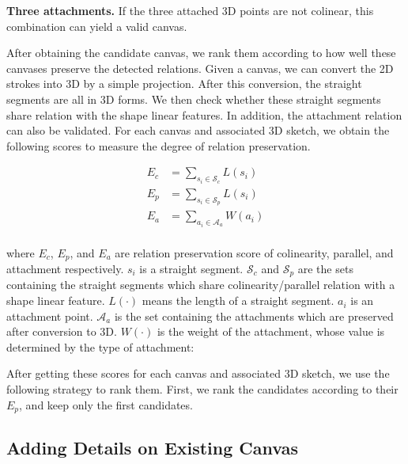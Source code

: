 \textbf{Three attachments.} If the three attached 3D points are not colinear, this combination can yield a valid canvas.

After obtaining the candidate canvas, we rank them according to how well these canvases preserve the detected relations. Given a canvas, we can convert the 2D strokes into 3D by a simple projection. After this conversion, the straight segments are all in 3D forms. We then check whether these straight segments share relation with the shape linear features. In addition, the attachment relation can also be validated. For each canvas and associated 3D sketch, we obtain the following scores to measure the degree of relation preservation.

\begin{equation}
\begin{aligned}
E_c &= \sum_{s_i\in \mathcal{S}_c} L(s_i)\\  
E_p &= \sum_{s_i\in \mathcal{S}_p} L(s_i)\\
E_a &= \sum_{a_i\in \mathcal{A}_a} W(a_i)\\
\end{aligned}
\end{equation}

where $E_c$, $E_p$, and $E_a$ are relation preservation score of colinearity, parallel, and attachment respectively. $s_i$ is a straight segment. $\mathcal{S}_c$ and $\mathcal{S}_p$ are the sets containing the straight segments which share colinearity/parallel relation with a shape linear feature. $L(\cdot)$ means the length of a straight segment. $a_i$ is an attachment point. $\mathcal{A}_a$ is the set containing the attachments which are preserved after conversion to 3D. $W(\cdot)$ is the weight of the attachment, whose value is determined by the type of attachment:  

After getting these scores for each canvas and associated 3D sketch, we use the following strategy to rank them. First, we rank the candidates according to their $E_p$, and keep only the first  candidates. 


\subsection{Adding Details on Existing Canvas}




